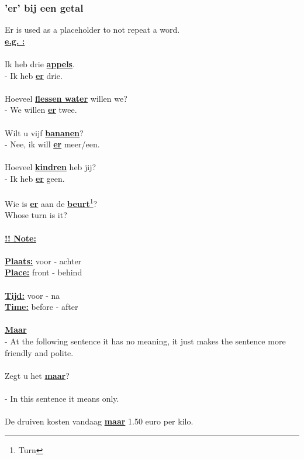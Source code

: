 \documentclass[a4paper,14pt]{extarticle}
\newcommand{\note}[2]{\underline{\textbf{#1}}\footnote{#2}}
\newcommand{\attention}[1]{\underline{\textbf{!! #1}}}
\newcommand{\emp}[1]{\underline{\textbf{#1}}}
\begin{document}
\begin{paracol}{2}
\subsubsection{'er' bij een getal}
Er is used as a placeholder to not repeat a word. \\
\emp{e.g. : } \\ \\
Ik heb drie \emp{appels}. \\
- Ik heb \emp{er} drie. \\ \\
Hoeveel \emp{flessen water} willen we? \\
- We willen \emp{er} twee. \\ \\ 
Wilt u vijf \emp{bananen}? \\ 
- Nee, ik will \emp{er} meer/een. \\ \\
Hoeveel \emp{kindren} heb jij? \\
- Ik heb \emp{er} geen. \\ \\
Wie is \emp{er} aan de \note{beurt}{Turn}? \\
Whose turn is it? \\
\switchcolumn
\hfill \\
\attention{Note:} \\ \\
\emp{Plaats:} voor - achter \\
\emp{Place:} front - behind \\ \\
\emp{Tijd:} voor - na \\
\emp{Time:} before - after \\ \\
\emp{Maar} \\
- At the following sentence it has no meaning, it just makes the sentence more friendly and polite. \\ \\
Zegt u het \emp{maar}? \\ \\
- In this sentence it means only. \\ \\
De druiven kosten vandaag \emp{maar} 1.50 euro per kilo.
\end{paracol}
\end{document}
